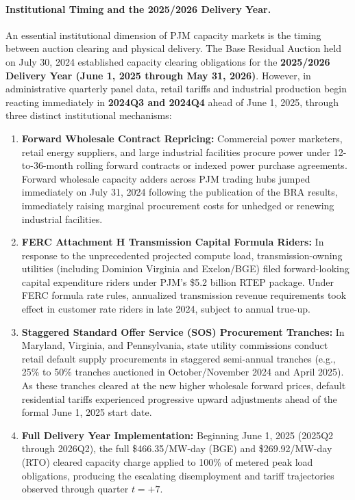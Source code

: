 \documentclass[11pt,a4paper]{article}
\begin{document}
\paragraph{Institutional Timing and the 2025/2026 Delivery Year.}
An essential institutional dimension of PJM capacity markets is the timing between auction clearing and physical delivery. The Base Residual Auction held on July 30, 2024 established capacity clearing obligations for the \textbf{2025/2026 Delivery Year (June 1, 2025 through May 31, 2026)}. However, in administrative quarterly panel data, retail tariffs and industrial production begin reacting immediately in \textbf{2024Q3 and 2024Q4} ahead of June 1, 2025, through three distinct institutional mechanisms:
\begin{enumerate}
    \item \textbf{Forward Wholesale Contract Repricing:} Commercial power marketers, retail energy suppliers, and large industrial facilities procure power under 12-to-36-month rolling forward contracts or indexed power purchase agreements. Forward wholesale capacity adders across PJM trading hubs jumped immediately on July 31, 2024 following the publication of the BRA results, immediately raising marginal procurement costs for unhedged or renewing industrial facilities.
    \item \textbf{FERC Attachment H Transmission Capital Formula Riders:} In response to the unprecedented projected compute load, transmission-owning utilities (including Dominion Virginia and Exelon/BGE) filed forward-looking capital expenditure riders under PJM's \$5.2 billion RTEP package. Under FERC formula rate rules, annualized transmission revenue requirements took effect in customer rate riders in late 2024, subject to annual true-up.
    \item \textbf{Staggered Standard Offer Service (SOS) Procurement Tranches:} In Maryland, Virginia, and Pennsylvania, state utility commissions conduct retail default supply procurements in staggered semi-annual tranches (e.g., 25\% to 50\% tranches auctioned in October/November 2024 and April 2025). As these tranches cleared at the new higher wholesale forward prices, default residential tariffs experienced progressive upward adjustments ahead of the formal June 1, 2025 start date.
    \item \textbf{Full Delivery Year Implementation:} Beginning June 1, 2025 (2025Q2 through 2026Q2), the full \$466.35/MW-day (BGE) and \$269.92/MW-day (RTO) cleared capacity charge applied to 100\% of metered peak load obligations, producing the escalating disemployment and tariff trajectories observed through quarter $t = +7$.
\end{enumerate}
\end{document}
